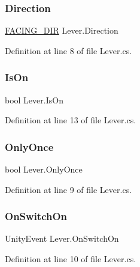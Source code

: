 \subsubsection{\texorpdfstring{Direction}{Direction}}
{\footnotesize\ttfamily \mbox{\hyperlink{_animal_8cs_a57d10208ebba781ae206546ada2002b6}{F\+A\+C\+I\+N\+G\+\_\+\+D\+IR}} Lever.\+Direction}



Definition at line 8 of file Lever.\+cs.

\mbox{\label{class_lever_ae7619f913adb314011fac83c4f218db5}} 
\subsubsection{\texorpdfstring{Is\+On}{IsOn}}
{\footnotesize\ttfamily bool Lever.\+Is\+On\hspace{0.3cm}{\ttfamily [protected]}}



Definition at line 13 of file Lever.\+cs.

\mbox{\label{class_lever_af2383e630c7e08865af9311f7fb8cb2e}} 
\subsubsection{\texorpdfstring{Only\+Once}{OnlyOnce}}
{\footnotesize\ttfamily bool Lever.\+Only\+Once}



Definition at line 9 of file Lever.\+cs.

\mbox{\label{class_lever_af3917ece96d129c91aa972d1ed478a1c}} 
\subsubsection{\texorpdfstring{On\+Switch\+On}{OnSwitchOn}}
{\footnotesize\ttfamily Unity\+Event Lever.\+On\+Switch\+On}



Definition at line 10 of file Lever.\+cs.

\mbox{\label{class_lever_ae8882d10f3ab2572d162a6338e2ec36d}} 
